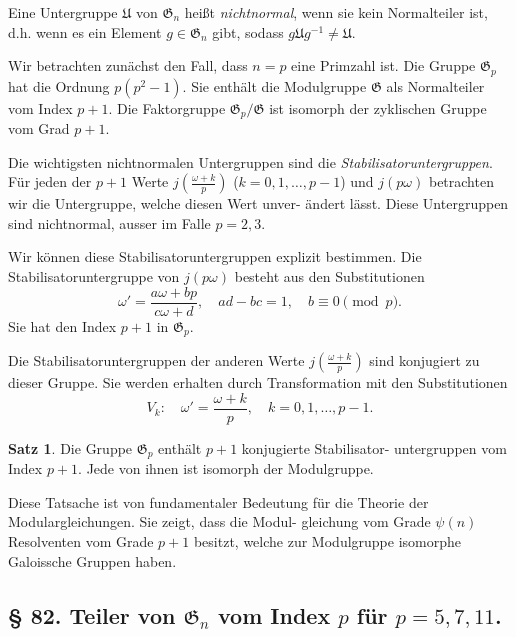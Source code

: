 \documentclass[12pt,a4paper]{article}
\theoremstyle{definition}
\newtheorem*{satz}{Satz}
\begin{document}
Eine Untergruppe $\mathfrak{U}$ von $\mathfrak{G}_n$ hei\ss t \textit{nichtnormal}, wenn
sie kein Normalteiler ist, d.h. wenn es ein Element $g \in \mathfrak{G}_n$
gibt, sodass $g\mathfrak{U}g^{-1} \neq \mathfrak{U}$.

Wir betrachten zun\"achst den Fall, dass $n = p$ eine Primzahl
ist. Die Gruppe $\mathfrak{G}_p$ hat die Ordnung $p(p^2-1)$. Sie enth\"alt
die Modulgruppe $\mathfrak{G}$ als Normalteiler vom Index $p+1$.
Die Faktorgruppe $\mathfrak{G}_p/\mathfrak{G}$ ist isomorph der zyklischen Gruppe
vom Grad $p+1$.

Die wichtigsten nichtnormalen Untergruppen sind die
\textit{Stabilisatoruntergruppen}. F\"ur jeden der $p+1$ Werte
$j\left(\frac{\omega+k}{p}\right)$ ($k = 0, 1, \ldots, p-1$) und $j(p\omega)$
betrachten wir die Untergruppe, welche diesen Wert unver-
\"andert l\"asst. Diese Untergruppen sind nichtnormal, ausser
im Falle $p = 2, 3$.

Wir k\"onnen diese Stabilisatoruntergruppen explizit bestimmen.
Die Stabilisatoruntergruppe von $j(p\omega)$ besteht aus den
Substitutionen
\begin{equation}\tag{1}
\omega' = \frac{a\omega + bp}{c\omega + d}, \quad ad - bc = 1, \quad b \equiv 0 \pmod{p}.
\end{equation}
Sie hat den Index $p+1$ in $\mathfrak{G}_p$.

Die Stabilisatoruntergruppen der anderen Werte
$j\left(\frac{\omega+k}{p}\right)$ sind konjugiert zu dieser Gruppe.
Sie werden erhalten durch Transformation mit den Substitutionen
\begin{equation}\tag{2}
V_k: \quad \omega' = \frac{\omega + k}{p}, \quad k = 0, 1, \ldots, p-1.
\end{equation}

\begin{satz}
Die Gruppe $\mathfrak{G}_p$ enth\"alt $p+1$ konjugierte Stabilisator-
untergruppen vom Index $p+1$. Jede von ihnen ist isomorph
der Modulgruppe.
\end{satz}

Diese Tatsache ist von fundamentaler Bedeutung f\"ur die
Theorie der Modulargleichungen. Sie zeigt, dass die Modul-
gleichung vom Grade $\psi(n)$ Resolventen vom Grade $p+1$
besitzt, welche zur Modulgruppe isomorphe Galoissche Gruppen
haben.

\newpage
\subsection*{\S{} 82. Teiler von $\mathfrak{G}_n$ vom Index $p$ f\"ur $p = 5, 7, 11$.}
\end{document}
